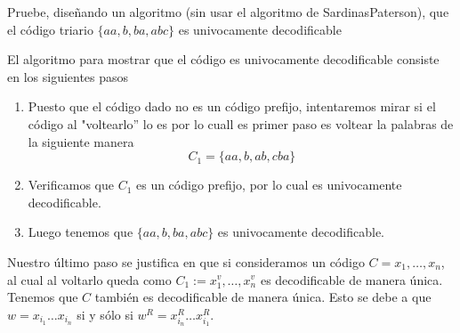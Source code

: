 
Pruebe, diseñando un algoritmo (sin usar el algoritmo de SardinasPaterson), que el código triario $\{aa, b, ba, abc\}$ es univocamente decodificable
\begin{sol}
El algoritmo para mostrar que el código es univocamente decodificable consiste en los siguientes pasos
\begin{enumerate}
\item Puesto que el código dado no es un código prefijo, intentaremos mirar si el código al "voltearlo''  lo es por lo cuall es primer paso es voltear la palabras de la siguiente manera 
$$C_1=\{aa,b,ab,cba\}$$
\item Verificamos que $C_1$ es un código prefijo, por lo cual es univocamente decodificable.
\item Luego tenemos que  $\{aa, b, ba, abc\}$ es univocamente decodificable.
\end{enumerate}
Nuestro último paso se justifica en que si consideramos un código $ C = x_1, \dots, x_n $, al cual al voltarlo queda como $C_1 := x_1^v, \dots, x_n^v $ es decodificable de manera única. Tenemos que $C$  también es decodificable de manera única. Esto se debe a que $ w = x_{i_1} \dots x_{i_n} $ si y sólo si $ w^R = x_{i_n}^R\dots x_{i_1}^R$. 
    
\end{sol}